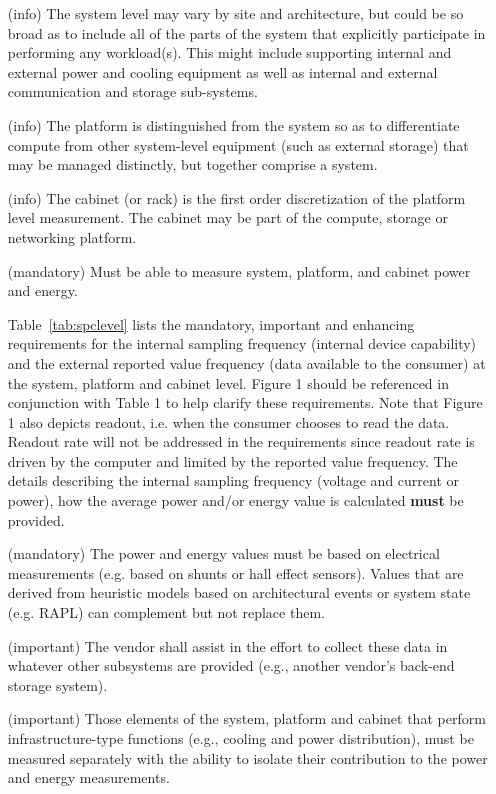 \begin{itemize}
\item[(info)]
The system level may vary by site and architecture, but could be so broad as to include all of the parts of the system that explicitly participate in performing any workload(s). This might include supporting internal and external power and cooling equipment as well as internal and external communication and storage sub-systems. 
\item[(info)]
The platform is distinguished from the system so as to differentiate compute from other system-level equipment (such as external storage) that may be managed distinctly, but together comprise a system. 
\item[(info)]
The cabinet (or rack) is the first order discretization of the platform level measurement. The cabinet may be part of the compute, storage or networking platform. 
\item[(mandatory)]
Must be able to measure system, platform, and cabinet power and energy.

	Table~\ref{tab:spclevel} lists the mandatory, important and enhancing requirements for the internal sampling frequency (internal device capability) and the external reported value frequency (data available to the consumer) at the system, platform and cabinet level. Figure 1 should be referenced in conjunction with Table 1 to help clarify these requirements. Note that Figure 1 also depicts readout, i.e. when the consumer chooses to read the data. Readout rate will not be addressed in the requirements since readout rate is driven by the computer and limited by the reported value frequency. The details describing the internal sampling frequency (voltage and current or power), how the average power and/or energy value is calculated \textbf{must} be provided.

\item[(mandatory)]
The power and energy values must be based on electrical measurements (e.g. based on shunts or hall effect sensors). Values that are derived from heuristic models based on architectural events or system state (e.g. RAPL) can complement but not replace them.

\item[(important)]
The vendor shall assist in the effort to collect these data in whatever other subsystems are provided (e.g., another vendor’s back-end storage system). 

\item[(important)]
Those elements of the system, platform and cabinet that perform infrastructure-type functions (e.g., cooling and power distribution), must be measured separately with the ability to isolate their contribution to the power and energy measurements.  

\end{itemize}


